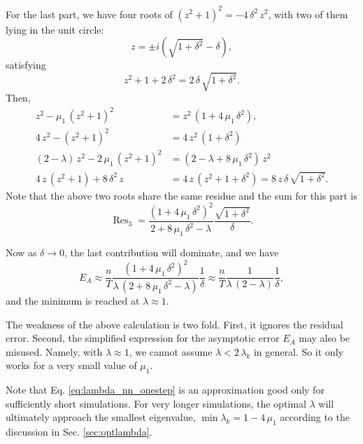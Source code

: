 \documentclass[reprint, floatfix]{revtex4-1}
\newcommand{\Err}{E}
\begin{document}
{For the last part,
we have four roots of
$(z^2 + 1)^2 = - 4 \, \delta^2 \, z^2$,
with two of them lying in the unit circle:
$$
z = \pm i \left( \sqrt{ 1 + \delta^2 } - \delta \right),
$$
satisfying
$$
z^2 + 1 + 2 \, \delta^2 = 2 \, \delta \, \sqrt{1 + \delta^2}.
$$
Then,
$$
\begin{aligned}
z^2 - \mu_1 \, \left( z^2 + 1 \right)^2
&= z^2 \, (1 + 4 \, \mu_1 \, \delta^2),
\\
4 \, z^2 - \left( z^2 + 1 \right)^2
&=
4 \, z^2 \, (1 + \delta^2)
\\
%
(2 - \lambda) \, z^2
- 2 \, \mu_1 \, \left( z^2 + 1 \right)^2
&=
\left(
  2 - \lambda + 8 \, \mu_1 \, \delta^2
\right) \, z^2
\\
%
4 \, z \, \left( z^2 + 1 \right)
+
8 \, \delta^2 \, z
&=
4 \, z \, (z^2 + 1 + \delta^2)
=
8 \, z \, \delta \, \sqrt{ 1 + \delta^2 }.
\end{aligned}
$$
Note that the above two roots share the same
residue and the sum for this part is
$$
\operatorname{Res}_3
=
\frac{ \left( 1 + 4 \, \mu_1 \, \delta^2 \right)^2 }
     {        2 + 8 \, \mu_1 \, \delta^2 - \lambda }
\frac{ \sqrt{ 1 + \delta^2 } }
     {        \delta         }.
$$

Now as $\delta \to 0$, the last contribution will dominate,
and we have
$$
\Err_A
\approx
\frac{ n } { T }
\frac{ (1 + 4 \, \mu_1 \, \delta^2)^2 }
{ \lambda \, (2 + 8 \, \mu_1 \, \delta^2 - \lambda) }
\frac{ 1 } { \delta }
\approx
\frac{ n } { T }
\frac{ 1 }
{ \lambda \, (2 - \lambda) }
\frac{ 1 } { \delta },
$$
and the minimum is reached at $\lambda \approx 1$.

The weakness of the above calculation is two fold.
%
First, it ignores the residual error.
%
Second, the simplified expression for the asymptotic error
$E_A$ may also be misused.
%
Namely, with $\lambda \approx 1$,
we cannot assume $\lambda < 2 \, \lambda_k$ in general.
%
So it only works for a very small value of $\mu_1$.
}



Note that Eq. \eqref{eq:lambda_nn_onestep}
is an approximation good only
for sufficiently short simulations.
%
For very longer simulations,
the optimal $\lambda$
will ultimately approach
the smallest eigenvalue,
$\min \lambda_k = 1 - 4 \, \mu_1$
according to the discussion in Sec. \ref{sec:optlambda}.


\end{document}
